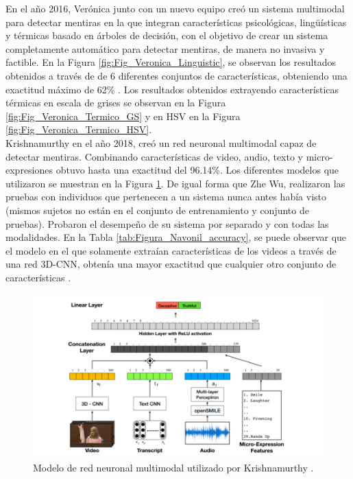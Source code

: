 \begin{onehalfspacing}
En el año 2016, Verónica junto con un nuevo equipo creó un sistema  multimodal para detectar mentiras en la que integran características psicológicas, lingüísticas y térmicas basado en árboles de decisión, con el objetivo de crear un sistema completamente automático para detectar mentiras, de manera no invasiva y factible. En la Figura \ref{fig:Fig_Veronica_Linguistic}, se observan los resultados obtenidos a través de de 6 diferentes conjuntos de características, obteniendo una exactitud máximo de 62\% \cite{Abouelenien2016AnalyzingApproach}. Los resultados obtenidos extrayendo características térmicas en escala de grises se observan en la Figura \ref{fig:Fig_Veronica_Termico_GS} y en HSV en la Figura \ref{fig:Fig_Veronica_Termico_HSV}.\\

Krishnamurthy en el año 2018, creó un red neuronal multimodal capaz de detectar mentiras. Combinando características de video, audio, texto y micro-expresiones obtuvo hasta una exactitud del 96.14\%. Los diferentes modelos que utilizaron se muestran en la Figura \ref{fig:Figura_Navonil_Modelo}. De igual forma que Zhe Wu, realizaron las pruebas con individuos que pertenecen a un sistema nunca antes había visto (mismos sujetos no están en el conjunto de entrenamiento y conjunto de pruebas). Probaron el desempeño de su sistema por separado y con todas las modalidades. En la Tabla \ref{tab:Figura_Navonil_accuracy}, se puede observar que el modelo en el que solamente extraían características de los videos a través de una red 3D-CNN, obtenía una mayor exactitud que cualquier otro conjunto de características \cite{KrishnamurthyADetection}.\\

\begin{figure}[h!]
	\centering
	\includegraphics[width=13cm,keepaspectratio]{XX_Figures/Figura_Navonil_Modelo.png}
	\caption{\footnotesize Modelo de red neuronal multimodal utilizado por Krishnamurthy \cite{KrishnamurthyADetection}.}
	\label{fig:Figura_Navonil_Modelo}
\end{figure}


\end{onehalfspacing}
